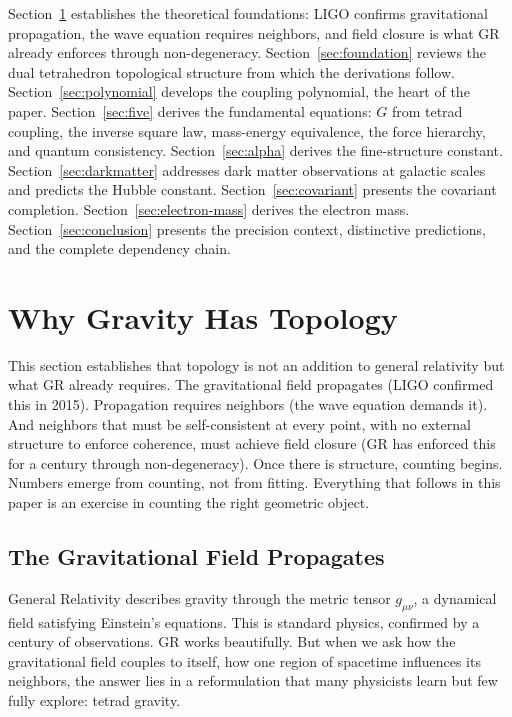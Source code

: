 \documentclass[aps,prd,preprint,superscriptaddress,showpacs,preprintnumbers,amsmath,amssymb,nofootinbib]{revtex4-2}
\begin{document}
Section~\ref{sec:theory} establishes the theoretical foundations: LIGO confirms gravitational propagation, the wave equation requires neighbors, and field closure is what GR already enforces through non-degeneracy. Section~\ref{sec:foundation} reviews the dual tetrahedron topological structure from which the derivations follow. Section~\ref{sec:polynomial} develops the coupling polynomial, the heart of the paper. Section~\ref{sec:five} derives the fundamental equations: $G$ from tetrad coupling, the inverse square law, mass-energy equivalence, the force hierarchy, and quantum consistency. Section~\ref{sec:alpha} derives the fine-structure constant. Section~\ref{sec:darkmatter} addresses dark matter observations at galactic scales and predicts the Hubble constant. Section~\ref{sec:covariant} presents the covariant completion. Section~\ref{sec:electron-mass} derives the electron mass. Section~\ref{sec:conclusion} presents the precision context, distinctive predictions, and the complete dependency chain.

\section{Why Gravity Has Topology}
\label{sec:theory}

This section establishes that topology is not an addition to general relativity but what GR already requires. The gravitational field propagates (LIGO confirmed this in 2015). Propagation requires neighbors (the wave equation demands it). And neighbors that must be self-consistent at every point, with no external structure to enforce coherence, must achieve field closure (GR has enforced this for a century through non-degeneracy). Once there is structure, counting begins. Numbers emerge from counting, not from fitting. Everything that follows in this paper is an exercise in counting the right geometric object.

\subsection{The Gravitational Field Propagates}
\label{subsec:propagates}

General Relativity describes gravity through the metric tensor $g_{\mu\nu}$, a dynamical field satisfying Einstein's equations. This is standard physics, confirmed by a century of observations. GR works beautifully. But when we ask how the gravitational field couples to itself, how one region of spacetime influences its neighbors, the answer lies in a reformulation that many physicists learn but few fully explore: tetrad gravity.
\end{document}
